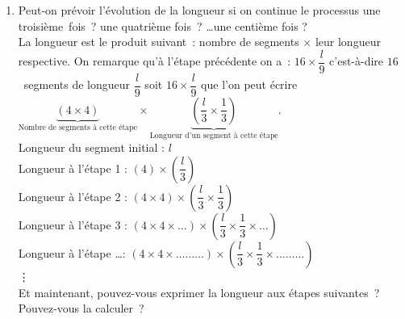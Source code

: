 \begin{enumerate}
	\item Peut-on prévoir l'évolution de la longueur si on continue le processus une troisième~fois~? une quatrième fois~? \ldots une centième fois ?\\
	La longueur est le produit suivant~:  \og nombre de segments\fg{} $\times$ \og leur longueur respective\fg{}. On remarque qu'à l'étape précédente on a~: $16 \times \dfrac{l}{9}$ c'est-à-dire $16$~segments de longueur $\dfrac{l}{9}$ soit $16 \times \dfrac{l}{9}$ que l'on peut écrire $\underbrace{\left( 4 \times 4 \right)}_{\text{Nombre de segments à cette étape}} \times \underbrace{\left(\dfrac{l}{3} \times \dfrac{1}{3}\right)}_{\text{Longueur d'un segment à cette étape}}$.\\[2em]
	Longueur du segment initial : $l$\\
	Longueur à l'étape 1 : $\left( 4 \right) \times \left( \dfrac{l}{3} \right)$\\
	Longueur à l'étape 2 : $\left( 4 \times 4 \right) \times \left( \dfrac{l}{3} \times \dfrac{1}{3} \right)$\\
	Longueur à l'étape 3 : $\left( 4 \times 4 \times \ldots \right) \times \left( \dfrac{l}{3} \times \dfrac{1}{3} \times \ldots \right)$\\
	Longueur à l'étape \ldots : $\left( 4 \times 4 \times \ldots \ldots \ldots \right) \times \left( \dfrac{l}{3} \times \dfrac{1}{3} \times \ldots \ldots \ldots \right)$\\
	\vdots\\[1em]

	Et maintenant, pouvez-vous exprimer la longueur aux étapes suivantes~?\\
	Pouvez-vous la calculer~?\\[2em]
	
\end{enumerate}